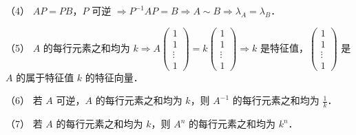 \begin{fcard}{（4）}
$AP=PB$，$P$ 可逆 $\Rightarrow P^{-1}AP=B\Rightarrow A\sim B\Rightarrow \lambda_A=\lambda_B$．
\end{fcard}

\begin{fcard}{（5）}
$A$ 的每行元素之和均为 $k\Rightarrow A\begin{pmatrix}1\\1\\\vdots\\1\end{pmatrix}=k\begin{pmatrix}1\\1\\\vdots\\1\end{pmatrix}\Rightarrow k$ 是特征值，$\begin{pmatrix}1\\1\\\vdots\\1\end{pmatrix}$ 是 $A$ 的属于特征值 $k$ 的特征向量．
\end{fcard}

\begin{fcard}{（6）}
若 $A$ 可逆，$A$ 的每行元素之和均为 $k$，则 $A^{-1}$ 的每行元素之和均为 $\frac{1}{k}$．
\end{fcard}

\begin{fcard}{（7）}
若 $A$ 的每行元素之和均为 $k$，则 $A^n$ 的每行元素之和均为 $k^n$．
\end{fcard}

